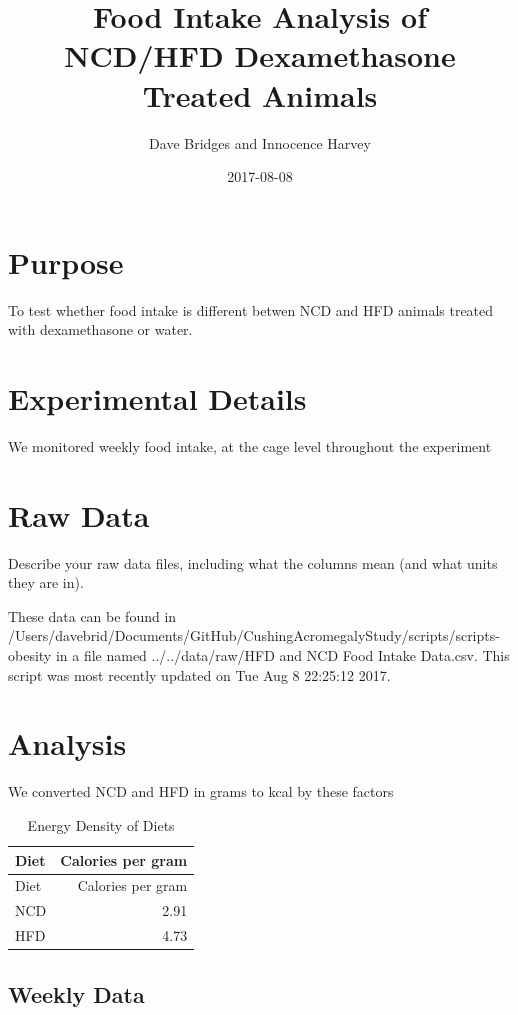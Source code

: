 \documentclass[]{article}
\title{Food Intake Analysis of NCD/HFD Dexamethasone Treated Animals}
\author{Dave Bridges and Innocence Harvey}
\date{2017-08-08}
\begin{document}
\maketitle

{
\setcounter{tocdepth}{2}
\tableofcontents
}
\section{Purpose}\label{purpose}

To test whether food intake is different betwen NCD and HFD animals
treated with dexamethasone or water.

\section{Experimental Details}\label{experimental-details}

We monitored weekly food intake, at the cage level throughout the
experiment

\section{Raw Data}\label{raw-data}

Describe your raw data files, including what the columns mean (and what
units they are in).

These data can be found in
/Users/davebrid/Documents/GitHub/CushingAcromegalyStudy/scripts/scripts-obesity
in a file named ../../data/raw/HFD and NCD Food Intake Data.csv. This
script was most recently updated on Tue Aug 8 22:25:12 2017.

\section{Analysis}\label{analysis}

We converted NCD and HFD in grams to kcal by these factors

\begin{longtable}[]{@{}lr@{}}
\caption{Energy Density of Diets}\tabularnewline
\toprule
Diet & Calories per gram\tabularnewline
\midrule
\endfirsthead
\toprule
Diet & Calories per gram\tabularnewline
\midrule
\endhead
NCD & 2.91\tabularnewline
HFD & 4.73\tabularnewline
\bottomrule
\end{longtable}

\subsection{Weekly Data}\label{weekly-data}
\end{document}
